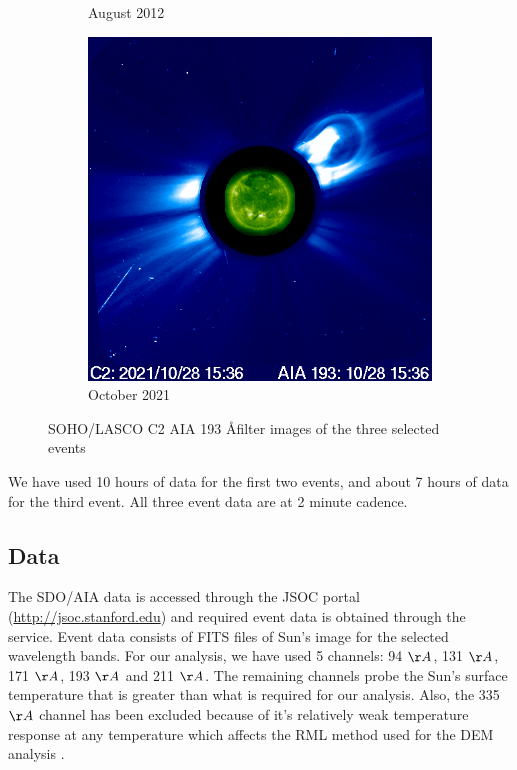 \message{ !name(main.tex)}\documentclass[12pt]{article}
\begin{document}
\begin{figure}[h!]
\begin{subfigure}[b]{0.3\textwidth}
        \caption[August  2012 CME]{August  2012}
        \label{fig:soho_cme_aug_31_2012}
    \end{subfigure}
    \hfill
    \begin{subfigure}[b]{0.3\textwidth}
        \includegraphics[width=\textwidth]{images/soho_cme_oct_28_2021_aia193.png}
        \caption[October  2021]{October  2021}
        \label{fig:soho_cme_oct_28_2021}
    \end{subfigure}
    \caption[SOHO/LASCO C2 images with AIA 193 \AA filter]{SOHO/LASCO C2 AIA 193 \AA filter images of the three selected events}
    \label{fig:cme_events_soho_pics_aia193}
\end{figure}

\noindent We have used 10 hours of data for the first two events, and about 7 hours of data for the third event. All three event data are at 2 minute cadence.

\subsection{Data}
\label{sec:data_used}

The SDO/AIA data is accessed through the JSOC portal (\url{http://jsoc.stanford.edu}) and required event data is obtained through the service. Event data consists of FITS files of Sun's image for the selected wavelength bands. For our analysis, we have used 5 channels: 94 $\AA$, 131 $\AA$, 171 $\AA$, 193 $\AA$ and 211 $\AA$. The remaining channels probe the Sun's surface temperature that is greater than what is required for our analysis. Also, the 335 $\AA$ channel has been excluded because of it's relatively weak temperature response at any temperature which affects the RML method used for the DEM analysis \citep{Massa2023}.
\end{document}
